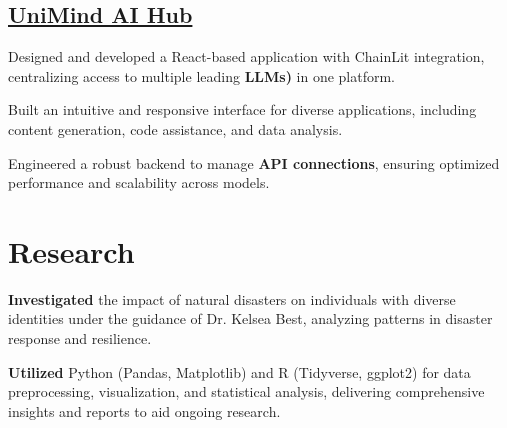\documentclass[]{farhan-resume-openfont}
\begin{document}
\begin{minipage}[t]{0.70\textwidth}
    \subsection{\href{https://yourapp.link}{UniMind AI Hub}}
    \begin{tightemize}
        \vspace{10pt}
        \item Designed and developed a React-based application with ChainLit integration,
        centralizing access to multiple leading \textbf{ LLMs)} in one platform.
        \item Built an intuitive and responsive interface for diverse applications, including
        content generation, code assistance, and data analysis.
        \item Engineered a robust backend to manage \textbf{API connections}, ensuring
        optimized performance and scalability across models.
    \end{tightemize}
    \section{Research}

    \begin{tightemize}
        \vspace{10pt}
        \item \textbf{Investigated} the impact of natural disasters on individuals with diverse identities under the guidance of Dr. Kelsea Best, analyzing patterns in disaster response and resilience.
        \item \textbf{Utilized} Python (Pandas, Matplotlib) and R (Tidyverse, ggplot2) for data preprocessing, visualization, and statistical analysis, delivering comprehensive insights and reports to aid ongoing research.
    \end{tightemize}
\end{minipage}
\end{document}

